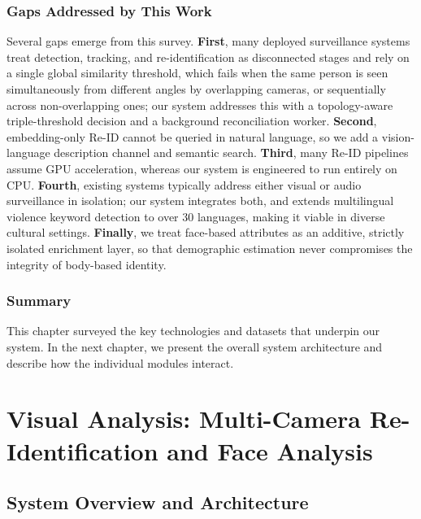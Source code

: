 \documentclass[12pt]{report}
\begin{document}
\section{Gaps Addressed by This Work}
Several gaps emerge from this survey. \textbf{First}, many deployed surveillance systems treat detection, tracking, and re-identification as disconnected stages and rely on a single global similarity threshold, which fails when the same person is seen simultaneously from different angles by overlapping cameras, or sequentially across non-overlapping ones; our system addresses this with a topology-aware triple-threshold decision and a background reconciliation worker. \textbf{Second}, embedding-only Re-ID cannot be queried in natural language, so we add a vision-language description channel and semantic search. \textbf{Third}, many Re-ID pipelines assume GPU acceleration, whereas our system is engineered to run entirely on CPU. \textbf{Fourth}, existing systems typically address either visual or audio surveillance in isolation; our system integrates both, and extends multilingual violence keyword detection to over 30 languages, making it viable in diverse cultural settings. \textbf{Finally}, we treat face-based attributes as an additive, strictly isolated enrichment layer, so that demographic estimation never compromises the integrity of body-based identity.

\section{Summary}
This chapter surveyed the key technologies and datasets that underpin our system. In the next chapter, we present the overall system architecture and describe how the individual modules interact.

\newpage

\part{Visual Analysis: Multi-Camera Re-Identification and Face Analysis}

\chapter{System Overview and Architecture}
\setcounter{section}{0}
\end{document}
